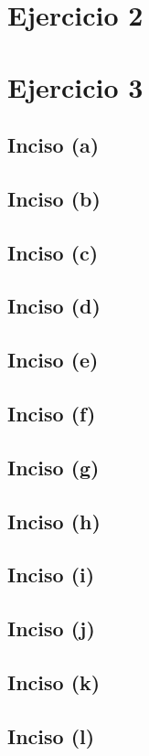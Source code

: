 \documentclass[a4paper,12pt]{article}
\begin{document}
    \section*{Ejercicio 2}

    \section*{Ejercicio 3}
        \subsection*{Inciso (a)}
        \subsection*{Inciso (b)}
        \subsection*{Inciso (c)}
        \subsection*{Inciso (d)}
        \subsection*{Inciso (e)}
        \subsection*{Inciso (f)}
        \subsection*{Inciso (g)}
        \subsection*{Inciso (h)}
        \subsection*{Inciso (i)}
        \subsection*{Inciso (j)}
        \subsection*{Inciso (k)}
        \subsection*{Inciso (l)}
\end{document}
